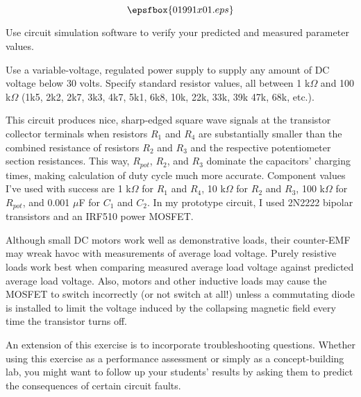 

$$\epsfbox{01991x01.eps}$$

\vfil \eject






Use circuit simulation software to verify your predicted and measured parameter values.







Use a variable-voltage, regulated power supply to supply any amount of DC voltage below 30 volts.  Specify standard resistor values, all between 1 k$\Omega$ and 100 k$\Omega$ (1k5, 2k2, 2k7, 3k3, 4k7, 5k1, 6k8, 10k, 22k, 33k, 39k 47k, 68k, etc.). 

This circuit produces nice, sharp-edged square wave signals at the transistor collector terminals when resistors $R_1$ and $R_4$ are substantially smaller than the combined resistance of resistors $R_2$ and $R_3$ and the respective potentiometer section resistances.  This way, $R_{pot}$, $R_2$, and $R_3$ dominate the capacitors' charging times, making calculation of duty cycle much more accurate.  Component values I've used with success are 1 k$\Omega$ for $R_1$ and $R_4$, 10 k$\Omega$ for $R_2$ and $R_3$, 100 k$\Omega$ for $R_{pot}$, and 0.001 $\mu$F for $C_1$ and $C_2$.  In my prototype circuit, I used 2N2222 bipolar transistors and an IRF510 power MOSFET.

Although small DC motors work well as demonstrative loads, their counter-EMF may wreak havoc with measurements of average load voltage.  Purely resistive loads work best when comparing measured average load voltage against predicted average load voltage.  Also, motors and other inductive loads may cause the MOSFET to switch incorrectly (or not switch at all!) unless a commutating diode is installed to limit the voltage induced by the collapsing magnetic field every time the transistor turns off.

An extension of this exercise is to incorporate troubleshooting questions.  Whether using this exercise as a performance assessment or simply as a concept-building lab, you might want to follow up your students' results by asking them to predict the consequences of certain circuit faults.




